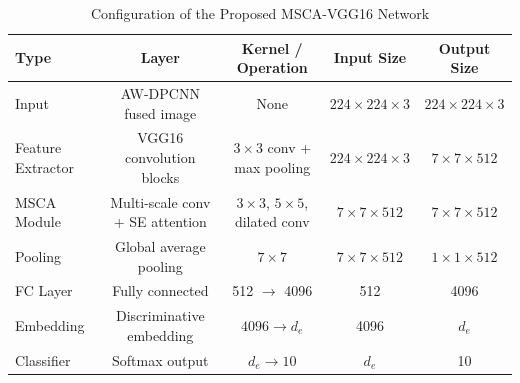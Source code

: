 \documentclass[anonymous]{iopjournal}
\begin{document}
\begin{table}
	\centering
	\caption{Configuration of the Proposed MSCA-VGG16 Network}
	\begin{tabular}{lcccc}
		\toprule
		\textbf{Type} & \textbf{Layer} & \textbf{Kernel / Operation} & \textbf{Input Size} & \textbf{Output Size} \\
		\midrule
		Input & AW-DPCNN fused image & None & $224 \times 224 \times 3$ & $224 \times 224 \times 3$ \\
		Feature Extractor & VGG16 convolution blocks & $3\times3$ conv + max pooling & $224 \times 224 \times 3$ & $7 \times 7 \times 512$ \\
		MSCA Module & Multi-scale conv + SE attention & $3\times3$, $5\times5$, dilated conv & $7 \times 7 \times 512$ & $7 \times 7 \times 512$ \\
		Pooling & Global average pooling & $7\times7$ & $7 \times 7 \times 512$ & $1 \times 1 \times 512$ \\
		FC Layer & Fully connected & 512 $\rightarrow$ 4096 & 512 & 4096 \\
		Embedding & Discriminative embedding & $4096 \rightarrow d_e$ & 4096 & $d_e$ \\
		Classifier & Softmax output & $d_e \rightarrow 10$ & $d_e$ & 10 \\
		\bottomrule
	\end{tabular}
	\label{tab:msca_vgg16}
\end{table}
\end{document}

